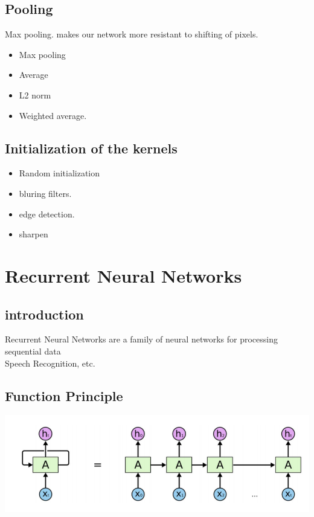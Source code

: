 \documentclass[a4paper,10pt,titlepage]{report}
\begin{document}
\subsection{Pooling}
Max pooling. makes our network more resistant to shifting of pixels.\\

\begin{itemize}
\item Max pooling
\item Average
\item L2 norm
\item Weighted average.
\end{itemize}
\subsection{Initialization of the kernels}

\begin{itemize}
\item Random initialization
\item bluring filters.
\item edge detection.
\item sharpen
%
\end{itemize}

\newpage
\section{Recurrent Neural Networks}
\subsection{introduction}
Recurrent Neural Networks are a family of neural networks for processing sequential data \\

Speech Recognition, etc.

\subsection{Function Principle}

\includegraphics[scale=0.1]{RNN_unrolled.png}
\end{document}
